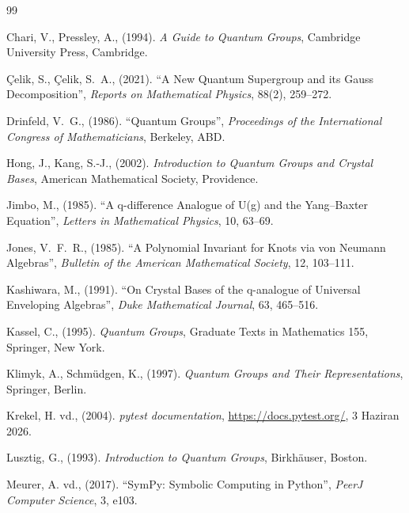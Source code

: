 \documentclass[12pt,a4paper]{report}
\numberwithin{equation}{chapter}
\renewcommand{\thechapter}{\arabic{chapter}}
\renewcommand{\thesection}{\thechapter.\arabic{section}}
\renewcommand{\thefigure}{\thechapter.\arabic{figure}}
\renewcommand{\thetable}{\thechapter.\arabic{table}}
\theoremstyle{plain}
\theoremstyle{definition}
\begin{document}
\begin{thebibliography}{99}
\setlength{\itemsep}{6pt}

Chari, V., Pressley, A., (1994). \emph{A Guide to Quantum Groups}, Cambridge University Press, Cambridge.

Çelik, S., Çelik, S.~A., (2021). ``A New Quantum Supergroup and its Gauss Decomposition'', \emph{Reports on Mathematical Physics}, 88(2), 259--272.

Drinfeld, V.~G., (1986). ``Quantum Groups'', \emph{Proceedings of the International Congress of Mathematicians}, Berkeley, ABD.

Hong, J., Kang, S.-J., (2002). \emph{Introduction to Quantum Groups and Crystal Bases}, American Mathematical Society, Providence.

Jimbo, M., (1985). ``A q-difference Analogue of U(g) and the Yang--Baxter Equation'', \emph{Letters in Mathematical Physics}, 10, 63--69.

Jones, V.~F.~R., (1985). ``A Polynomial Invariant for Knots via von Neumann Algebras'', \emph{Bulletin of the American Mathematical Society}, 12, 103--111.

Kashiwara, M., (1991). ``On Crystal Bases of the q-analogue of Universal Enveloping Algebras'', \emph{Duke Mathematical Journal}, 63, 465--516.

Kassel, C., (1995). \emph{Quantum Groups}, Graduate Texts in Mathematics 155, Springer, New York.

Klimyk, A., Schmüdgen, K., (1997). \emph{Quantum Groups and Their Representations}, Springer, Berlin.

Krekel, H. vd., (2004). \emph{pytest documentation}, \url{https://docs.pytest.org/}, 3 Haziran 2026.

Lusztig, G., (1993). \emph{Introduction to Quantum Groups}, Birkhäuser, Boston.

Meurer, A. vd., (2017). ``SymPy: Symbolic Computing in Python'', \emph{PeerJ Computer Science}, 3, e103.

\end{thebibliography}



\clearpage
{}
{}
\appendix
\renewcommand{\thechapter}{\Alph{chapter}}
\renewcommand{\thesection}{\thechapter.\arabic{section}}
\renewcommand{\thefigure}{\thechapter.\arabic{figure}}
\renewcommand{\thetable}{\thechapter.\arabic{table}}
\titleformat{\chapter}[hang]
  {\normalfont\fontsize{17.5}{21}\bfseries}{EK~\thechapter}{12pt}{}
\end{document}
